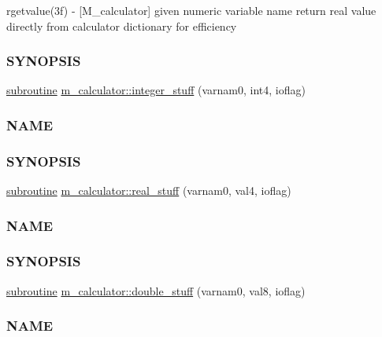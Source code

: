 \begin{DoxyCompactItemize}
\begin{DoxyCompactList}
rgetvalue(3f) -\/ \mbox{[}M\+\_\+calculator\mbox{]} given numeric variable name return real value directly from calculator dictionary for efficiency \subsubsection*{S\+Y\+N\+O\+P\+S\+IS}\end{DoxyCompactList}\item 
\hyperlink{M__stopwatch_83_8txt_acfbcff50169d691ff02d4a123ed70482}{subroutine} \hyperlink{namespacem__calculator_ae760c3bf7e4e933427bad6c92cd16dfb}{m\+\_\+calculator\+::integer\+\_\+stuff} (varnam0, int4, ioflag)
\begin{DoxyCompactList}\small\item\em \subsubsection*{N\+A\+ME}

\subsubsection*{S\+Y\+N\+O\+P\+S\+IS}\end{DoxyCompactList}\item 
\hyperlink{M__stopwatch_83_8txt_acfbcff50169d691ff02d4a123ed70482}{subroutine} \hyperlink{namespacem__calculator_a8337bfb59665d3236fed48d316e3701b}{m\+\_\+calculator\+::real\+\_\+stuff} (varnam0, val4, ioflag)
\begin{DoxyCompactList}\small\item\em \subsubsection*{N\+A\+ME}

\subsubsection*{S\+Y\+N\+O\+P\+S\+IS}\end{DoxyCompactList}\item 
\hyperlink{M__stopwatch_83_8txt_acfbcff50169d691ff02d4a123ed70482}{subroutine} \hyperlink{namespacem__calculator_ab70b7eb8f684537155298c061b54c356}{m\+\_\+calculator\+::double\+\_\+stuff} (varnam0, val8, ioflag)
\begin{DoxyCompactList}\small\item\em \subsubsection*{N\+A\+ME}


\end{DoxyCompactList}
\end{DoxyCompactItemize}
